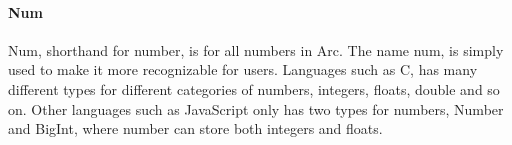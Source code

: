 
\paragraph*{Num}
Num, shorthand for number, is for all numbers in Arc. The name num, is simply used to make it more recognizable for users. Languages such as C, has many different types for different categories of numbers, integers, floats, double and so on. Other languages such as JavaScript only has two types for numbers, Number and BigInt, where number can store both integers and floats. 


